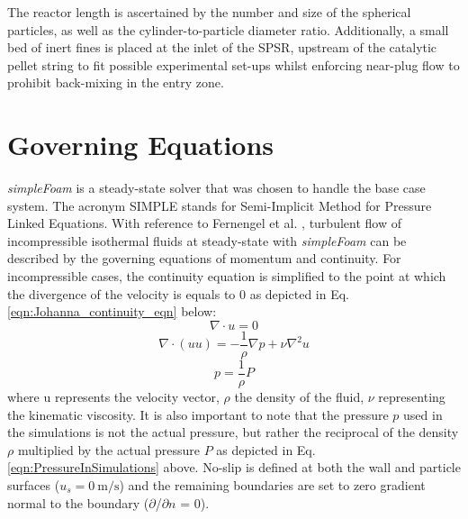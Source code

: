 The reactor length is ascertained by the number and size of the spherical particles, as well as the cylinder-to-particle diameter ratio. Additionally, a small bed of inert fines is placed at the inlet of the SPSR, upstream of the catalytic pellet string to fit possible experimental set-ups whilst enforcing near-plug flow to prohibit back-mixing in the entry zone.
\section{Governing Equations}
\emph{simpleFoam} is a steady-state solver that was chosen to handle the base case system. The acronym SIMPLE stands for Semi-Implicit Method for Pressure Linked Equations. With reference to Fernengel et al. \cite{Fernengel2020}, turbulent flow of incompressible isothermal fluids at steady-state with \emph{simpleFoam} can be described by the governing equations of momentum and continuity. For incompressible cases, the continuity equation is simplified to the point at which the divergence of the velocity is equals to 0 as depicted in Eq. \ref{eqn:Johanna_continuity_eqn} below:
%
\begin{equation} \label{eqn:Johanna_continuity_eqn}
\nabla\cdot u = 0
\end{equation}
\begin{equation} \label{eqn:Johanna_momentum_eqn}
\nabla\cdot(uu)=-\frac{1}{\rho}\nabla p+\nu\nabla^2u
\end{equation}
\begin{equation}\label{eqn:PressureInSimulations}
p = \frac{1}{\rho} P
\end{equation}
where u represents the velocity vector, $\rho$ the density of the fluid, $\nu$ representing the kinematic viscosity. It is also important to note that the pressure $p$ used in the simulations is not the actual pressure, but rather the reciprocal of the density $\rho$ multiplied by the actual pressure $P$ as depicted in Eq. \ref{eqn:PressureInSimulations} above. No-slip is defined at both the wall and particle surfaces ($u_s = \SI{0}{\metre\per\second}$) and the remaining boundaries are set to zero gradient normal to the boundary ($\partial$/$\partial$$n$ = 0).

